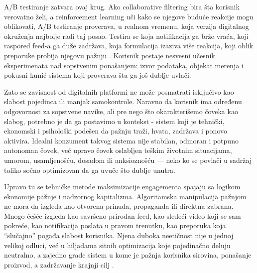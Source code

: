 A/B testiranje zatvara ovaj krug. Ako collaborative filtering bira šta korisnik verovatno želi, a reinforcement learning uči kako se njegove buduće reakcije mogu oblikovati, A/B testiranje proverava, u realnom vremenu, koja verzija digitalnog okruženja najbolje radi taj posao. Testira se koja notifikacija ga brže vraća, koji raspored feed-a ga duže zadržava, koja formulacija izaziva više reakcija, koji oblik preporuke probija njegovu pažnju \cite{kohavi2017online}. Korisnik postaje nesvesni učesnik eksperimenata nad sopstvenim ponašanjem: izvor podataka, objekat merenja i pokusni kunić sistema koji proverava šta ga još dublje uvlači.

Zato se zavisnost od digitalnih platformi ne može posmatrati isključivo kao slabost pojedinca ili manjak samokontrole. Naravno da korisnik ima određenu odgovornost za sopstvene navike, ali pre nego što okarakterišemo čoveka kao slabog, potrebno je da ga postavimo u kontekst - sistem koji je tehnički, ekonomski i psihološki podešen da pažnju traži, hvata, zadržava i ponovo aktivira. Idealni konzument takvog sistema nije stabilan, odmoran i potpuno autonoman čovek, već upravo čovek oslabljen teškim životnim situacijama, umorom, usamljenošću, dosadom ili anksioznošću — neko ko se povlači u sadržaj toliko sočno optimizovan da ga uvuče što dublje unutra.

Upravo tu se tehničke metode maksimizacije engagementa spajaju sa logikom ekonomije pažnje i nadzornog kapitalizma. Algoritamska manipulacija pažnjom ne mora da izgleda kao otvorena prinuda, propaganda ili direktna zabrana. Mnogo češće izgleda kao savršeno prirodan feed, kao sledeći video koji se sam pokreće, kao notifikacija poslata u pravom trenutku, kao preporuka koja “slučajno” pogađa slabost korisnika. Njena duboka neetičnost nije u jednoj velikoj odluci, već u hiljadama sitnih optimizacija koje pojedinačno deluju neutralno, a zajedno grade sistem u kome je pažnja korisnika sirovina, ponašanje proizvod, a zadržavanje krajnji cilj \cite{gonzalez2024attention}.